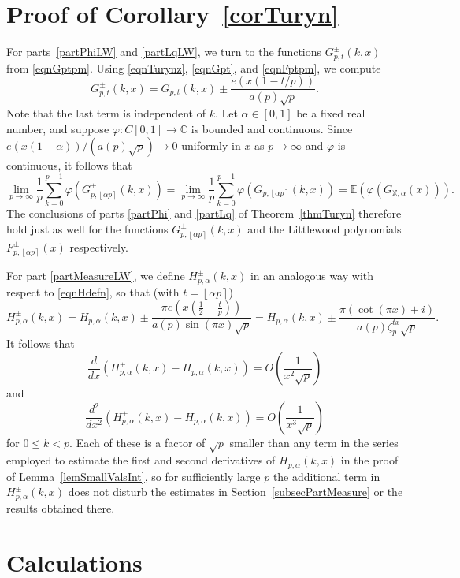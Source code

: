 \documentclass[reqno]{amsart}
\numberwithin{equation}{section}
\numberwithin{table}{section}
\numberwithin{figure}{section}
\newcommand{\round}[1]{\left\lfloor#1\right\rceil}
\begin{document}
\section{Proof of Corollary~\ref{corTuryn}}\label{secProofCor}

For parts~\ref{partPhiLW} and \ref{partLqLW}, we turn to the functions $G_{p,t}^{\pm}(k,x)$ from \eqref{eqnGptpm}.
Using \eqref{eqnTurynz}, \eqref{eqnGpt}, and \eqref{eqnFptpm}, we compute
\[
G_{p,t}^{\pm}(k,x) = G_{p,t}(k,x) \pm \frac{e(x(1-t/p))}{a(p)\sqrt{p}}.
\]
Note that the last term is independent of $k$.
Let $\alpha\in[0,1]$ be a fixed real number, and suppose $\varphi : C[0,1] \to \mathbb{C}$ is bounded and continuous.
Since $e(x(1-\alpha))/(a(p)\sqrt{p}) \to 0$ uniformly in $x$ as $p\to\infty$ and $\varphi$ is continuous, it follows that
\[
\lim_{p\to\infty} \frac{1}{p} \sum_{k=0}^{p-1} \varphi\left(G_{p,\round{\alpha p}}^{\pm}(k, x)\right) =
\lim_{p\to\infty} \frac{1}{p} \sum_{k=0}^{p-1} \varphi\left(G_{p,\round{\alpha p}}(k, x)\right)
= \mathbb{E}(\varphi(G_{\mathbb{X},\alpha}(x))).
\]
The conclusions of parts \ref{partPhi} and \ref{partLq} of Theorem~\ref{thmTuryn} therefore hold just as well for the functions $G_{p,\round{\alpha p}}^{\pm}(k,x)$ and the Littlewood polynomials $F_{p,\round{\alpha p}}^{\pm}(x)$ respectively.

For part \ref{partMeasureLW}, we define $H_{p,\alpha}^{\pm}(k,x)$ in an analogous way with respect to \eqref{eqnHdefn}, so that (with $t=\round{\alpha p}$)
\[
H_{p,\alpha}^{\pm}(k,x)
= H_{p,\alpha}(k,x) \pm \frac{\pi e\left(x\left(\frac{1}{2}-\frac{t}{p}\right)\right)}{a(p)\sin(\pi x) \sqrt{p}}
= H_{p,\alpha}(k,x) \pm \frac{\pi(\cot(\pi x)+i)}{a(p)\zeta_p^{tx}\sqrt{p}}.
\]
It follows that
\[
\frac{d}{dx}\left(H_{p,\alpha}^{\pm}(k,x) - H_{p,\alpha}(k,x)\right) = O\left(\frac{1}{x^2\sqrt{p}}\right)
\]
and
\[
\frac{d^2}{dx^2}\left(H_{p,\alpha}^{\pm}(k,x) - H_{p,\alpha}(k,x)\right) = O\left(\frac{1}{x^3\sqrt{p}}\right)
\]
for $0\leq k<p$.
Each of these is a factor of $\sqrt{p}$ smaller than any term in the series employed to estimate the first and second derivatives of $H_{p,\alpha}(k,x)$ in the proof of Lemma~\ref{lemSmallValsInt}, so for sufficiently large $p$ the additional term in $H_{p,\alpha}^{\pm}(k,x)$ does not disturb the estimates in Section~\ref{subsecPartMeasure} or the results obtained there.


\section{Calculations}\label{secCalculations}
\end{document}
